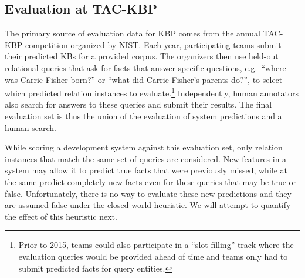 \subsection{Evaluation at TAC-KBP}

The primary source of evaluation data for KBP comes from the annual TAC-KBP competition organized by NIST.\@ %
Each year, participating teams submit their predicted KBs for a provided corpus.
The organizers then use held-out relational queries that ask for facts that answer specific questions, e.g.\ ``where was Carrie Fisher born?'' or ``what did Carrie Fisher's parents do?'', to select which predicted relation instances to evaluate.\footnote{%
  Prior to 2015, teams could also participate in a ``slot-filling'' track where the evaluation queries would be provided ahead of time and teams only had to submit predicted facts for query entities.}
Independently, human annotators also search for answers to these queries and submit their results.
The final evaluation set is thus the union of the evaluation of system predictions and a human search.

While scoring a development system against this evaluation set, only relation instances that match the same set of queries are considered.
New features in a system may allow it to predict true facts that were previously missed, while at the same predict completely new facts even for these queries that may be true or false.
Unfortunately, there is no way to evaluate these new predictions and they are assumed false under the closed world heuristic.
We will attempt to quantify the effect of this heuristic next.
